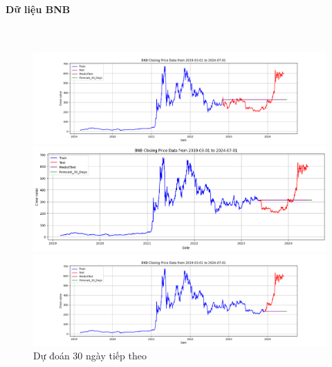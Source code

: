 \documentclass[conference]{IEEEtran}
\begin{document}
\paragraph{\textbf{Dữ liệu BNB}} \mbox{} \\
\begin{figure}[H]
    \centering
    \begin{minipage}{0.15\textwidth}
    \centering
    
    \includegraphics[width=1\textwidth]{Figure/ARIMA_BNB_30days_73.png}
    \end{minipage}
    \hfill
    \begin{minipage}{0.15\textwidth}
    \centering
    \includegraphics[width=1\textwidth]{Figure/ARIMA_BNB_30days_82.png}
    \end{minipage}
    \hfill
    \begin{minipage}{0.15\textwidth}
    \centering
    \includegraphics[width=1\textwidth]{Figure/ARIMA_BNB_30days_91.png}
    \end{minipage}
    \caption{Dự đoán 30 ngày tiếp theo}
    \label{fig:1}
\end{figure}
\end{document}

